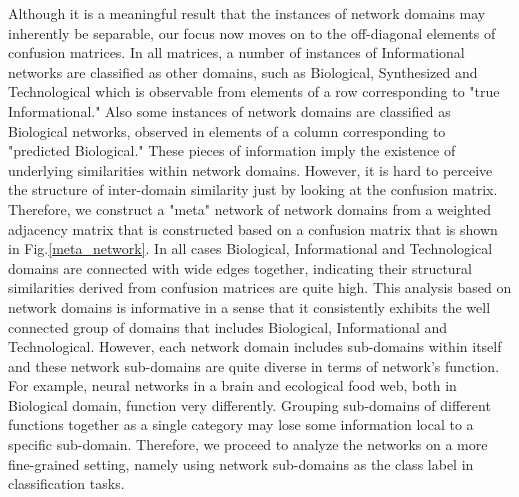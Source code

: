 \documentclass{article}
\begin{document}
Although it is a meaningful result that the instances of network domains may inherently be separable, our focus now moves on to the off-diagonal elements of confusion matrices. In all matrices, a number of instances of Informational networks are classified as other domains, such as Biological, Synthesized and Technological which is observable from elements of a row corresponding to  "true Informational." Also some instances of network domains are classified as Biological networks, observed in elements of a column corresponding to "predicted Biological." These pieces of information imply the existence of underlying similarities within network domains. However, it is hard to perceive the structure of inter-domain similarity just by looking at the confusion matrix. Therefore, we construct a "meta" network of network domains from a weighted adjacency matrix that is constructed based on a confusion matrix that is shown in Fig.\ref{meta_network}. In all cases Biological, Informational and Technological domains are connected with wide edges together, indicating their structural similarities derived from confusion matrices are quite high. This analysis based on network domains is informative in a sense that it consistently exhibits the well connected group of domains that includes Biological, Informational and Technological. However, each network domain includes sub-domains within itself and these network sub-domains are quite diverse in terms of network's function. For example, neural networks in a brain and ecological food web, both in Biological domain, function very differently. Grouping sub-domains of different functions together as a single category may lose some information local to a specific sub-domain. Therefore, we proceed to analyze the networks on a more fine-grained setting, namely using network sub-domains as the class label in classification tasks.
 
\end{document}

